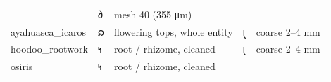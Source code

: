 \documentclass[12pt,a4paper]{article}
\begin{document}
\begin{longtable}[]{@{}lllll@{}}
\begin{minipage}[t]{0.17\columnwidth}
\end{minipage} & \begin{minipage}[t]{0.17\columnwidth}\raggedright
𐑔\strut
\end{minipage} & \begin{minipage}[t]{0.17\columnwidth}\raggedright
mesh 40 (355 μm)\strut
\end{minipage}\tabularnewline
\begin{minipage}[t]{0.17\columnwidth}\raggedright
ayahuasca\_icaros\strut
\end{minipage} & \begin{minipage}[t]{0.17\columnwidth}\raggedright
𐑸\strut
\end{minipage} & \begin{minipage}[t]{0.17\columnwidth}\raggedright
flowering tops, whole entity\strut
\end{minipage} & \begin{minipage}[t]{0.17\columnwidth}\raggedright
𐑚\strut
\end{minipage} & \begin{minipage}[t]{0.17\columnwidth}\raggedright
coarse 2--4 mm\strut
\end{minipage}\tabularnewline
\begin{minipage}[t]{0.17\columnwidth}\raggedright
hoodoo\_rootwork\strut
\end{minipage} & \begin{minipage}[t]{0.17\columnwidth}\raggedright
𐑰\strut
\end{minipage} & \begin{minipage}[t]{0.17\columnwidth}\raggedright
root / rhizome, cleaned\strut
\end{minipage} & \begin{minipage}[t]{0.17\columnwidth}\raggedright
𐑚\strut
\end{minipage} & \begin{minipage}[t]{0.17\columnwidth}\raggedright
coarse 2--4 mm\strut
\end{minipage}\tabularnewline
\begin{minipage}[t]{0.17\columnwidth}\raggedright
osiris\strut
\end{minipage} & \begin{minipage}[t]{0.17\columnwidth}\raggedright
𐑰\strut
\end{minipage} & \begin{minipage}[t]{0.17\columnwidth}\raggedright
root / rhizome, cleaned\strut
\end{minipage} & \begin{minipage}[t]{0.17\columnwidth}\raggedright

\end{minipage}
\end{longtable}
\end{document}
